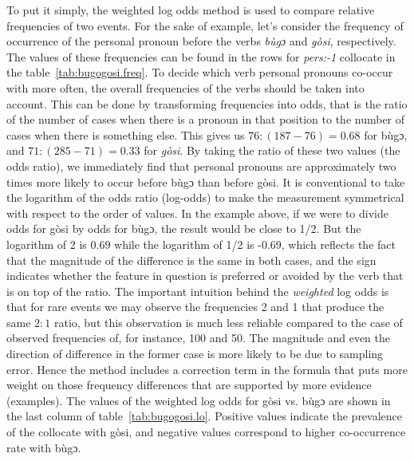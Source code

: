 \documentclass[12pt]{article}
\begin{document}
To put it simply, the weighted log odds method is used to compare
relative frequencies of two events. For the sake of example, let's
consider the frequency of occurrence of the personal pronoun before
the verbs \textit{bùgɔ} and \textit{gòsi}, respectively. The values of
these frequencies can be found in the rows for \textit{pers:-1}
collocate in the table~\ref{tab:bugogosi.freq}. To decide which verb
personal pronouns co-occur with more often, the overall frequencies of
the verbs should be taken into account. This can be done by
transforming frequencies into odds, that is the ratio of the number of
cases when there is a pronoun in that position to the number of cases
when there is something else. This gives us $76:(187-76)=0.68$ for
bùgɔ, and $71:(285-71)=0.33$ for \textit{gòsi}. By taking the ratio of
these two values (the odds ratio), we immediately find that personal
pronouns are approximately two times more likely to occur before bùgɔ
than before gòsi. It is conventional to take the logarithm of the odds
ratio (log-odds) to make the measurement symmetrical with respect to
the order of values. In the example above, if we were to divide odds
for gòsi by odds for bùgɔ, the result would be close to 1/2. But the
logarithm of 2 is 0.69 while the logarithm of 1/2 is -0.69, which
reflects the fact that the magnitude of the difference is the same in
both cases, and the sign indicates whether the feature in question is
preferred or avoided by the verb that is on top of the ratio.  The
important intuition behind the \textit{weighted} log odds is that for
rare events we may observe the frequencies 2 and 1 that produce the
same $2:1$ ratio, but this observation is much less reliable compared
to the case of observed frequencies of, for instance, 100 and 50. The
magnitude and even the direction of difference in the former case is
more likely to be due to sampling error. Hence the method includes a
correction term in the formula that puts more weight on those
frequency differences that are supported by more evidence
(examples). The values of the weighted log odds for gòsi vs. bùgɔ are
shown in the last column of table~\ref{tab:bugogosi.lo}. Positive
values indicate the prevalence of the collocate with gòsi, and
negative values correspond to higher co-occurrence rate with bùgɔ.
\end{document}
